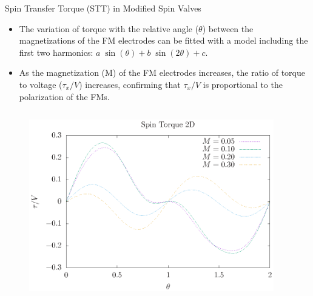 \documentclass[handout,t]{beamer}
\begin{document}
\begin{frame}{Spin Transfer Torque (STT) in Modified Spin Valves}
	\begin{itemize}
		\item The variation of torque with the relative angle ($\theta$) between the magnetizations of the FM electrodes can be fitted with a model including the first two harmonics: $a\;\sin(\theta) + b\;\sin(2\theta) + c$.
		\item As the magnetization (M) of the FM electrodes increases, the ratio of torque to voltage ($\tau_{x}/V$) increases, confirming that $\tau_x/V$ is proportional to the polarization of the FMs.
	\end{itemize}
	\begin{columns}
		\begin{column}[t]{0.5\linewidth}
			\begin{figure}[ht]
				\raggedleft
				\includegraphics[width=\linewidth]{../figures/stt-thesis.eps}
			\end{figure}
		\end{column}
		\begin{column}[t]{0.5\linewidth}
			\begin{table}[t]
				\raggedright
				\label{tbl:fitting}
				\end{table}
		\end{column}
	\end{columns}
\end{frame}
\end{document}
